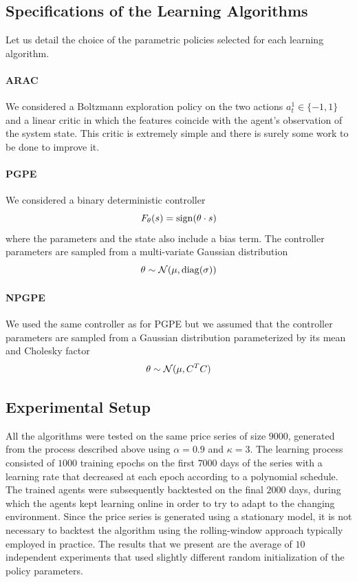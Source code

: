 \subsection{Specifications of the Learning Algorithms}
Let us detail the choice of the parametric policies selected for each learning algorithm.  

\paragraph{ARAC} 
We considered a Boltzmann exploration policy on the two actions $a_t^1 \in \{-1, 1\}$ and a linear critic in which the features coincide with the agent's observation of the system state. This critic is extremely simple and there is surely some work to be done to improve it. 

\paragraph{PGPE}
We considered a binary deterministic controller 
\begin{equation*}
	F_\theta(s) = \operatorname{sign}(\theta \cdot s)
\end{equation*}
where the parameters and the state also include a bias term. The controller parameters are sampled from a multi-variate Gaussian distribution
\begin{equation*}
	\theta \sim \mathcal{N}(\mu, \operatorname{diag}(\sigma))
\end{equation*}  

\paragraph{NPGPE}
We used the same controller as for PGPE but we assumed that the controller parameters are sampled from a Gaussian distribution parameterized by its mean and Cholesky factor
\begin{equation*}
	\theta \sim \mathcal{N}(\mu, C^T C)
\end{equation*}  


\subsection{Experimental Setup}   
All the algorithms were tested on the same price series of size $9000$, generated from the process described above using $\alpha = 0.9$ and $\kappa = 3$. The learning process consisted of $1000$ training epochs on the first $7000$ days of the series with a learning rate that decreased at each epoch according to a polynomial schedule. The trained agents were subsequently backtested on the final $2000$ days, during which the agents kept learning online in order to try to adapt to the changing environment. Since the price series is generated using a stationary model, it is not necessary to backtest the algorithm using the rolling-window approach typically employed in practice. The results that we present are the average of $10$ independent experiments that used slightly different random initialization of the policy parameters.   


